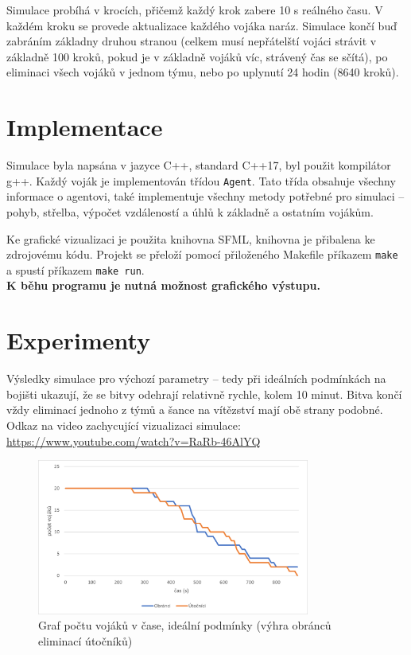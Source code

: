 \documentclass[a4paper, 11pt]{article}
\begin{document}
    Simulace probíhá v krocích, přičemž každý krok zabere 10 s reálného času. V každém kroku se provede aktualizace každého vojáka naráz. Simulace končí buď zabráním základny druhou stranou (celkem musí nepřátelští vojáci strávit v základně 100 kroků, pokud je v základně vojáků víc, strávený čas se sčítá), po eliminaci všech vojáků v jednom týmu, nebo po uplynutí 24 hodin (8640 kroků).

	\section{Implementace}
	Simulace byla napsána v jazyce C++, standard C++17, byl použit kompilátor g++. Každý voják je implementován třídou \texttt{Agent}. Tato třída obsahuje všechny informace o agentovi, také implementuje všechny metody potřebné pro simulaci -- pohyb, střelba, výpočet vzdáleností a úhlů k základně a ostatním vojákům.

    Ke grafické vizualizaci je použita knihovna SFML, knihovna je přibalena ke zdrojovému kódu. Projekt se přeloží pomocí přiloženého Makefile příkazem \texttt{make} a spustí příkazem \texttt{make run}.\\ \textbf{K běhu programu je nutná možnost grafického výstupu.}

	\section{Experimenty}
	Výsledky simulace pro výchozí parametry -- tedy při ideálních podmínkách na bojišti ukazují, že se bitvy odehrají relativně rychle, kolem 10 minut. Bitva končí vždy eliminací jednoho z týmů a šance na vítězství mají obě strany podobné. Odkaz na video zachycující vizualizaci simulace: \url{https://www.youtube.com/watch?v=RaRb-46AlYQ} \newpage
    \begin{figure}[h]
        \centering
        \includegraphics[width=0.8\textwidth]{graph1.png}
        \caption{Graf počtu vojáků v čase, ideální podmínky (výhra obránců eliminací útočníků)}
    \end{figure}
\end{document}
